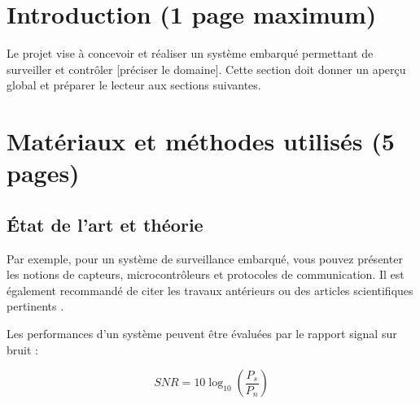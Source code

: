 

\section{Introduction (1 page maximum)}

Le projet vise à concevoir et réaliser un système embarqué permettant de surveiller et contrôler [préciser le domaine]. Cette section doit donner un aperçu global et préparer le lecteur aux sections suivantes.

\section{Matériaux et méthodes utilisés (5 pages)}


\subsection{État de l'art et théorie}


Par exemple, pour un système de surveillance embarqué, vous pouvez présenter les notions de capteurs, microcontrôleurs et protocoles de communication. Il est également recommandé de citer les travaux antérieurs ou des articles scientifiques pertinents \cite{floyd2007electronics}.

Les performances d’un système peuvent être évaluées par le rapport signal sur bruit :

\begin{equation}
	SNR = 10 \log_{10} \left(\frac{P_s}{P_n}\right)
	\label{eq:snr}
\end{equation}

